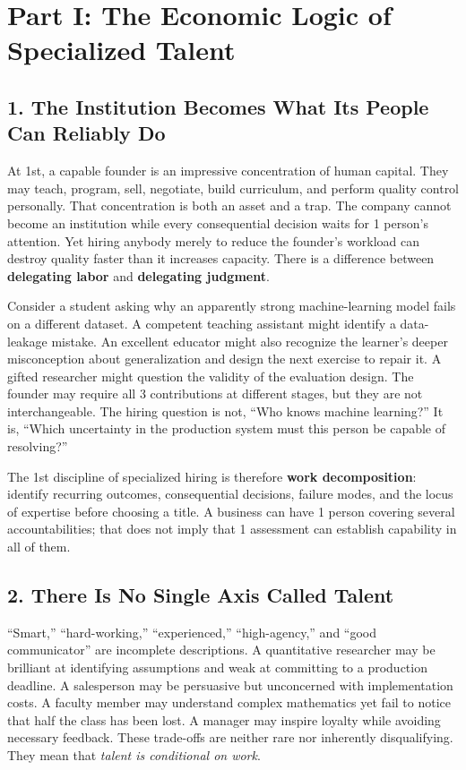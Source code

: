 \section*{Part I: The Economic Logic of Specialized Talent}

\subsection*{1. The Institution Becomes What Its People Can Reliably Do}

At 1st, a capable founder is an impressive concentration of human capital. They may teach, program, sell, negotiate, build curriculum, and perform quality control personally. That concentration is both an asset and a trap. The company cannot become an institution while every consequential decision waits for 1 person's attention. Yet hiring anybody merely to reduce the founder's workload can destroy quality faster than it increases capacity. There is a difference between \textbf{delegating labor} and \textbf{delegating judgment}.

Consider a student asking why an apparently strong machine-learning model fails on a different dataset. A competent teaching assistant might identify a data-leakage mistake. An excellent educator might also recognize the learner's deeper misconception about generalization and design the next exercise to repair it. A gifted researcher might question the validity of the evaluation design. The founder may require all 3 contributions at different stages, but they are not interchangeable. The hiring question is not, ``Who knows machine learning?'' It is, ``Which uncertainty in the production system must this person be capable of resolving?''

The 1st discipline of specialized hiring is therefore \textbf{work decomposition}: identify recurring outcomes, consequential decisions, failure modes, and the locus of expertise before choosing a title. A business can have 1 person covering several accountabilities; that does not imply that 1 assessment can establish capability in all of them.

\subsection*{2. There Is No Single Axis Called Talent}

``Smart,'' ``hard-working,'' ``experienced,'' ``high-agency,'' and ``good communicator'' are incomplete descriptions. A quantitative researcher may be brilliant at identifying assumptions and weak at committing to a production deadline. A salesperson may be persuasive but unconcerned with implementation costs. A faculty member may understand complex mathematics yet fail to notice that half the class has been lost. A manager may inspire loyalty while avoiding necessary feedback. These trade-offs are neither rare nor inherently disqualifying. They mean that \textit{talent is conditional on work}.

